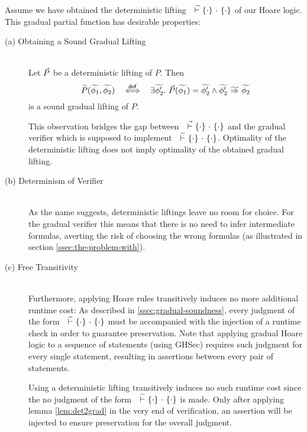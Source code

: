 Assume we have obtained the deterministic lifting ${~} \,\,\vec{\vdash}\,\, \{{\cdot}\} ~{\cdot}~ \{{\cdot}\}$ of our Hoare logic.
This gradual partial function has desirable properties:
\begin{description}
    \item[(a) Obtaining a Sound Gradual Lifting]
    \begin{lemma}~\\
        \label{lem:det2grad}
        Let $\vec{P}$ be a deterministic lifting of $P$.
        Then
        \begin{displaymath}
        \widetilde{P}(\widetilde{\phi_1}, \widetilde{\phi_2}) ~~\overset{\textup{\textsf{def}}}{\iff}~~ \exists \widetilde{\phi_2'}.~ \vec{P}(\widetilde{\phi_1}) = \widetilde{\phi_2'} \wedge {\widetilde{\phi_2'}} \,\,{\widetilde{\Rightarrow}}\,\, {\widetilde{\phi_2}}
        \end{displaymath}
        is a sound gradual lifting of $P$.
    \end{lemma}
    
    This observation bridges the gap between ${~} \,\,\vec{\vdash}\,\, \{{\cdot}\} ~{\cdot}~ \{{\cdot}\}$ and the gradual verifier which is supposed to implement ${~} \,\,\widetilde{\vdash}\,\, \{{\cdot}\} ~{\cdot}~ \{{\cdot}\}$.
    Optimality of the deterministic lifting does not imply optimality of the obtained gradual lifting.
    
    \item[(b) Determinism of Verifier]~\\
    As the name suggests, deterministic liftings leave no room for choice.
    For the gradual verifier this means that there is no need to infer intermediate formulas, averting the risk of choosing the wrong formulas (as illustrated in section \ref{ssec:the-problem-with}).
    
    \item[(c) Free Transitivity]~\\
    Furthermore, applying Hoare rules transitively induces no more additional runtime cost:
    As described in \ref{ssec:gradual-soundness}, every judgment of the form ${~} \,\,\widetilde{\vdash}\,\, \{{\cdot}\} ~{\cdot}~ \{{\cdot}\}$ must be accompanied with the injection of a runtime check in order to guarantee preservation.
    Note that applying gradual Hoare logic to a sequence of statements (using GHSec) requires such judgment for every single statement, resulting in assertions between every pair of statements.
    
    Using a deterministic lifting transitively induces no such runtime cost since the no judgment of the form ${~} \,\,\widetilde{\vdash}\,\, \{{\cdot}\} ~{\cdot}~ \{{\cdot}\}$ is made.
    Only after applying lemma \ref{lem:det2grad} in the very end of verification, an assertion will be injected to ensure preservation for the overall judgment.
    

\end{description}
